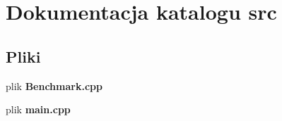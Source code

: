 \section{Dokumentacja katalogu src}
\label{dir_68267d1309a1af8e8297ef4c3efbcdba}
\subsection*{Pliki}
\begin{DoxyCompactItemize}
\item 
plik {\bf Benchmark.\-cpp}
\item 
plik {\bf main.\-cpp}
\end{DoxyCompactItemize}
